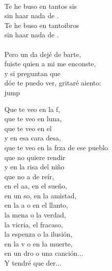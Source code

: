 \begin{cancion}%
	    \\
	Te he buso en tantos sis \\
	sin haar nada de . \\
	Te he buso en tantoibros\\
	sin haar nada de . \\
	\jump\\
	Pero un da dejé de barte, \\
	fuiste  quien a mi me enconste, \\
	y si  preguntan que \\
	dóe te puedo ver, gritaré aiento:\\jump\\
	\begin{chorus}%
	Que te veo en la f, \\
	que te veo en luna,\\
	que te veo en el  \\
	y en esa cara desa,\\
	que te veo en la frza de ese pueblo\\
	que no  quiere rendir\\
	y en la risa del niño \\
	que no a de reír,\\
	en el aa, en el sueño, \\
	en un so, en la amistad,\\
	en la a o en el llanto, \\
	la mena o la verdad,\\
	la vicria, el fracaso, \\
	la espenza o la ilusión,\\
	en la v o en la muerte, \\
	en un dro o una canción...\\
	Y tendré que der...\\

\end{chorus}
\end{cancion}
